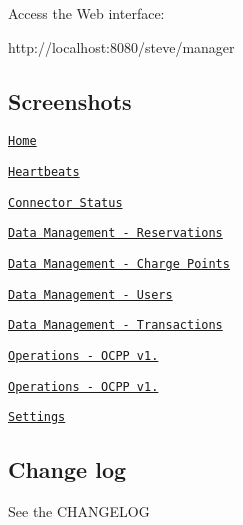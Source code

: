 Access the Web interface\-: \begin{DoxyVerb}http://localhost:8080/steve/manager
\end{DoxyVerb}


\subsection*{Screenshots }


\begin{DoxyEnumerate}
\item \href{website/screenshots/home.png}{\tt Home}
\item \href{website/screenshots/heartbeats.png}{\tt Heartbeats}
\item \href{website/screenshots/connector-status.png}{\tt Connector Status}
\item \href{website/screenshots/reservations.png}{\tt Data Management -\/ Reservations}
\item \href{website/screenshots/chargepoints.png}{\tt Data Management -\/ Charge Points}
\item \href{website/screenshots/users.png}{\tt Data Management -\/ Users}
\item \href{website/screenshots/transactions.png}{\tt Data Management -\/ Transactions}
\item \href{website/screenshots/ocpp12.png}{\tt Operations -\/ O\-C\-P\-P v1.}
\item \href{website/screenshots/ocpp15.png}{\tt Operations -\/ O\-C\-P\-P v1.}
\item \href{website/screenshots/settings.png}{\tt Settings}
\end{DoxyEnumerate}

\subsection*{Change log }

See the C\-H\-A\-N\-G\-E\-L\-O\-G 
